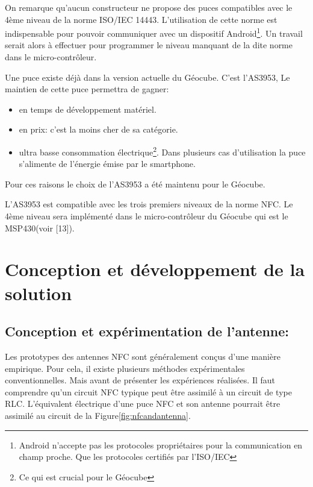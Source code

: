 \documentclass{themeensg}
\begin{document}
On remarque qu'aucun constructeur ne propose des puces compatibles avec le 4ème niveau de la norme ISO/IEC 14443. L'utilisation de cette norme est indispensable pour pouvoir communiquer avec un dispositif Android\footnote{Android n'accepte pas les protocoles propriétaires pour la communication en champ proche. Que les protocoles certifiés par l'ISO/IEC}. Un travail serait alors à effectuer pour programmer le niveau manquant de la dite norme dans le micro-contrôleur.

Une puce existe déjà dans la version actuelle du Géocube. C'est l'AS3953, Le maintien de cette puce permettra de gagner:
\begin{itemize}
\item en temps de développement matériel.
\item en prix: c'est la moins cher de sa catégorie.
\item ultra basse consommation électrique\footnote{Ce qui est crucial pour le Géocube}. Dans plusieurs cas d'utilisation la puce s'alimente de l'énergie émise par le smartphone.
\end{itemize}
Pour ces raisons le choix de l'AS3953 a été maintenu pour le Géocube.

L'AS3953 est compatible avec les trois premiers niveaux de la norme NFC. Le 4ème niveau sera implémenté dans le micro-contrôleur du Géocube qui est le MSP430(voir [13]).

\section{Conception et développement de la solution}

\subsection{Conception et expérimentation de l'antenne:}

Les prototypes des antennes NFC sont généralement conçus d'une manière empirique. Pour cela, il existe plusieurs méthodes expérimentales conventionnelles. Mais avant de présenter les expériences réalisées. Il faut comprendre qu'un circuit NFC typique peut être assimilé à un circuit de type RLC. L'équivalent électrique d'une puce NFC et son antenne pourrait être assimilé au circuit de la Figure\ref{fig:nfcandantenna}.
\end{document}
